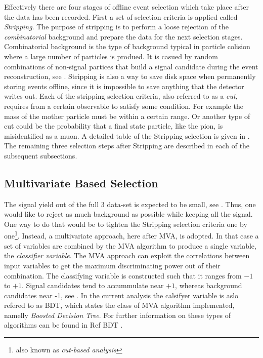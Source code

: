 
Effectively there are four stages of offline event selection which take place after the data has been recorded.
First a set of selection criteria is applied called {\it Stripping}. The purpose of stripping is to perform
a loose rejection of the {\it combinatorial} background and prepare the data for the next selection stages.
Combinatorial background is the type of background typical in particle colision where a large number of
particles is produed. It is casued by random combinations of non-signal partices that build a signal
candidate during the event reconstruction, see .
Stripping is also a way to save disk space when permanently storing events offline, since it is impossible to save anything
that the detector writes out. Each of the stripping selection criteria, also referred to as a {\it cut},
requires from a certain observable to satisfy some condition. For example the mass of the mother particle \Bs must be within
a certain range. Or another type of cut could be the probability that a final state particle, like the pion, is misidentified
as a muon. A detailed table of the Stripping selection is given in . The remaining three selection
steps after Stripping are described in each of the subsequent subsections.

\subsection{Multivariate Based Selection}
\label{Multivariate_Based_Selection}

The \BsJpsiKst signal yield out of the full 3 \invfb data-set is expected to be small, see . Thus, one would like to
reject as much background as possible while keeping all the signal. One way to do that would be to tighten the Stripping selection criteria
one by one\footnote{also known as {\it cut-based analysis}}. Instead, a multivariate approach, here after MVA, is adopted.
In that case a set of variables are combined by the MVA algorithm to produce a single variable, the {\it classifier variable}.
The MVA approach can exploit the correlations between input variables to get the maximum discriminating power out of their combination.
The classifying variable is constructed such that it ranges from $-1$ to $+1$. Signal candidates tend to accummulate near $+1$,
whereas background candidates near -1, see . In the current analysis the calsifyer variable is aslo refered
to as BDT, which states the class of MVA algorithm implemented, namelly {\it Boosted Decision Tree}. For further information on these
types of algorithms can be found in {\color{red}Ref BDT }.

